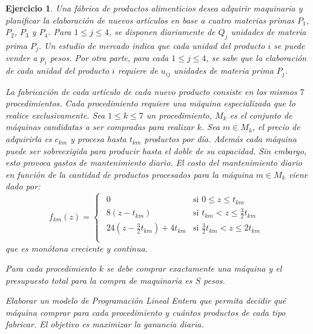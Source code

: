 \documentclass[a4paper,oneside,12pt]{amsart}
\newtheorem{quest}{Ejercicio}
\begin{document}



\begin{quest}
    Una fábrica de productos alimenticios desea adquirir maquinaria  y planificar la elaboración de nuevos artículos en base a cuatro materias primas $P_1$, $P_2$, $P_3$ y $P_4$. Para $1\leq j\leq 4$, se disponen diariamente de $Q_j$ unidades de materia prima $P_j$. Un estudio de mercado indica que cada unidad del producto $i$ se puede vender a $p_i$ pesos. Por otra parte, para cada $1\leq j\leq 4$, se sabe que la elaboración de cada unidad del producto $i$ requiere de $u_{ij}$ unidades de materia prima $P_j$.
    
    La fabricación de cada artículo de cada nuevo producto consiste en los mismos $7$ procedimientos.
    Cada procedimiento requiere una máquina especializada que lo realice exclusivamente. Sea $1\leq k\leq 7$ un procedimiento, $M_k$ es el conjunto de máquinas candidatas a ser compradas para realizar $k$. Sea $m\in M_k$, el precio de adquirirla es $c_{km}$ y procesa hasta $t_{km}$ productos por día. Además cada máquina puede ser sobreexigida para producir hasta el doble de su capacidad. Sin embargo, esto provoca gastos de mantenimiento diario. El costo del mantenimiento diario en función de la cantidad de productos procesados para la máquina $m\in M_k$ viene dado por:
    \[f_{km}(z) = \begin{cases}
    \begin{array}{ll}
        0 & \text{si $0\leq z\leq t_{km}$} \\
        8(z-t_{km}) & \text{si $t_{km} < z\leq \frac{3}{2}t_{km}$} \\
        24(z-\frac{3}{2}t_{km})+4t_{km} & \text{si $\frac{3}{2}t_{km} < z \leq 2t_{km}$} \\
    \end{array}
    \end{cases}\]
    que es monótona creciente y continua.
    
    Para cada procedimiento $k$ se debe comprar exactamente una máquina y el presupuesto total para la compra de maquinaria es $S$ pesos.
    
    Elaborar un modelo de Programación Lineal Entera que permita decidir qué máquina comprar para cada procedimiento y cuántos productos de cada tipo fabricar. El objetivo es maximizar la ganancia diaria.
\end{quest}


\end{document}
